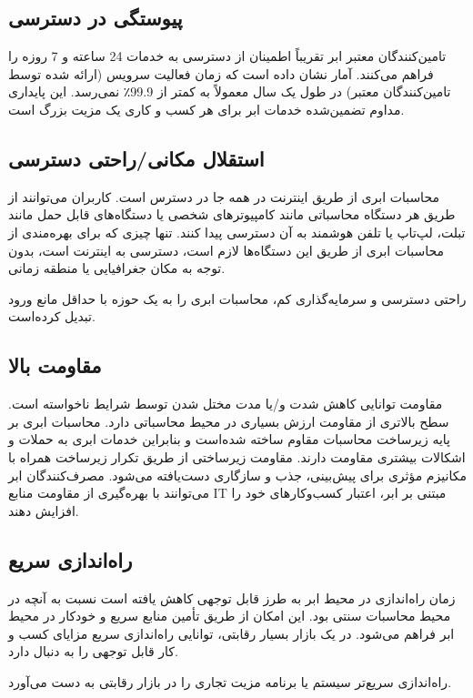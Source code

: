 \documentclass{book}
\begin{document}
    \subsection{پیوستگی در دسترسی}
    تامین‌کنندگان معتبر ابر تقریباً اطمینان از دسترسی به خدمات 24 ساعته و 7 روزه را فراهم می‌کنند. آمار نشان داده است که زمان فعالیت سرویس (ارائه شده توسط تامین‌کنندگان معتبر) در طول یک سال معمولاً به کمتر از 99.9٪ نمی‌رسد. این پایداری مداوم تضمین‌شده خدمات ابر برای هر کسب و کاری یک مزیت بزرگ است.

    \subsection{استقلال مکانی/راحتی دسترسی}
    محاسبات ابری از طریق اینترنت در همه جا در دسترس است. کاربران می‌توانند از طریق هر دستگاه محاسباتی مانند کامپیوترهای شخصی یا دستگاه‌های قابل حمل مانند تبلت، لپ‌تاپ یا تلفن هوشمند به آن دسترسی پیدا کنند. تنها چیزی که برای بهره‌مندی از محاسبات ابری از طریق این دستگاه‌ها لازم است، دسترسی به اینترنت است، بدون توجه به مکان جغرافیایی یا منطقه زمانی.

    راحتی دسترسی و سرمایه‌گذاری کم، محاسبات ابری را به یک حوزه با حداقل مانع ورود تبدیل کرده‌است.

    \subsection{مقاومت بالا}
    مقاومت توانایی کاهش شدت و/یا مدت مختل شدن توسط شرایط ناخواسته است. سطح بالاتری از مقاومت ارزش بسیاری در محیط محاسباتی دارد. محاسبات ابری بر پایه زیرساخت محاسبات مقاوم ساخته شده‌است و بنابراین خدمات ابری به حملات و اشکالات بیشتری مقاومت دارند. مقاومت زیرساختی از طریق تکرار زیرساخت همراه با مکانیزم مؤثری برای پیش‌بینی، جذب و سازگاری دست‌یافته می‌شود. مصرف‌کنندگان ابر می‌توانند با بهره‌گیری از مقاومت منابع IT مبتنی بر ابر، اعتبار کسب‌وکارهای خود را افزایش دهند.

    \subsection{راه‌اندازی سریع}
    زمان راه‌اندازی در محیط ابر به طرز قابل توجهی کاهش یافته است نسبت به آنچه در محیط محاسبات سنتی بود. این امکان از طریق تأمین منابع سریع و خودکار در محیط ابر فراهم می‌شود. در یک بازار بسیار رقابتی، توانایی راه‌اندازی سریع مزایای کسب و کار قابل توجهی را به دنبال دارد.

    راه‌اندازی سریع‌تر سیستم یا برنامه مزیت تجاری را در بازار رقابتی به دست می‌آورد.
\end{document}
